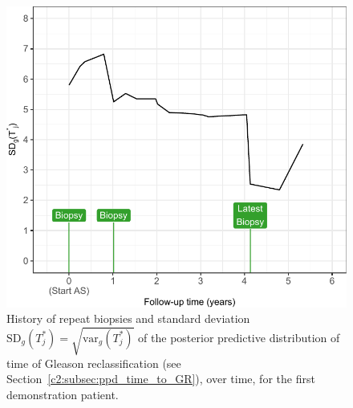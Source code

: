 \begin{figure}
\includegraphics{contents/c2/images/c2_fig2c.pdf}
\caption{History of repeat biopsies and standard deviation ${\mbox{SD}_g(T^*_j) = \sqrt{\mbox{var}_g(T^*_j)}}$ of the posterior predictive distribution of time of Gleason reclassification (see Section~\ref{c2:subsec:ppd_time_to_GR}), over time, for the first demonstration patient.}
\label{c2:fig:2c}
\end{figure}